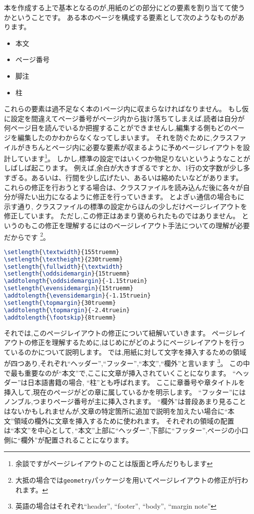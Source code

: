 本を作成する上で基本となるのが,用紙のどの部分にどの要素を割り当てて使うかということです。
ある本のページを構成する要素として次のようなものがあります。
\begin{itemize}
	\item 本文
	\item ページ番号
	\item 脚注
	\item 柱
\end{itemize}

これらの要素は過不足なく本の1ページ内に収まらなければなりません。
もし仮に設定を間違えてページ番号がページ内から抜け落ちてしまえば,読者は自分が何ページ目を読んでいるか把握することができませんし,編集する側もどのページを編集したのかわからなくなってしまいます。
それを防ぐために,クラスファイルがきちんとページ内に必要な要素が収まるように予めページレイアウトを設計しています\footnote{余談ですがページレイアウトのことは版面と呼んだりもします}。
しかし,標準の設定ではいくつか物足りないというようなことがしばしば起こります。
例えば,余白が大きすぎるですとか、1行の文字数が少し多すぎる。あるいは、行間を少し広げたい、あるいは縮めたいなどがあります。
これらの修正を行おうとする場合は、クラスファイルを読み込んだ後に各々が自分が得たい出力になるように修正を行っていきます。
とよぎぃ通信の場合もに示す通り,
クラスファイルの標準の設定からほんの少しだけページレイアウトを修正しています。
ただし,この修正はあまり褒められたものではありません。
というのもこの修正を理解するには{\pLaTeX}のページレイアウト手法についての理解が必要だからです
\footnote{大抵の場合では\texttt{geometry}パッケージを用いてページレイアウトの修正が行われます。}。
\begin{lstlisting}[caption = ページレイアウトの修正,label = list:layout,language = tex]
\setlength{\textwidth}{155truemm}
\setlength{\textheight}{230truemm}
\setlength{\fullwidth}{\textwidth}
\setlength{\oddsidemargin}{15truemm}
\addtolength{\oddsidemargin}{-1.15truein}
\setlength{\evensidemargin}{15truemm}
\addtolength{\evensidemargin}{-1.15truein}
\setlength{\topmargin}{30truemm}
\addtolength{\topmargin}{-2.4truein}
\addtolength{\footskip}{8truemm}
\end{lstlisting}

それでは,このページレイアウトの修正について紐解いていきます。
ページレイアウトの修正を理解するために,はじめに{\pLaTeX}がどのようにページレイアウトを行っているのかについて説明します。
{\pLaTeX}では,用紙に対して文字を挿入するための領域が四つあり,それぞれ``ヘッダー'',``フッター'',``本文'',``欄外''と言います
\footnote{英語の場合はそれぞれ``header'', ``footer'', ``body'', ``margin note''}。
この中で最も重要なのが``本文''で,ここに文章が挿入されていくことになります。
``ヘッダー''は日本語書籍の場合, ``柱''とも呼ばれます。
ここに章番号や章タイトルを挿入して,現在のページがどの章に属しているかを明示します。
``フッター''にはノンブル,つまりページ番号が主に挿入されます。
``欄外''は普段あまり見ることはないかもしれませんが,文章の特定箇所に追加で説明を加えたい場合に``本文''領域の欄外に文章を挿入するために使われます。
それぞれの領域の配置は``本文''を中心として,\,``本文''上部に``ヘッダー'',下部に``フッター'',ページの小口側に``欄外''が配置されることになります。


